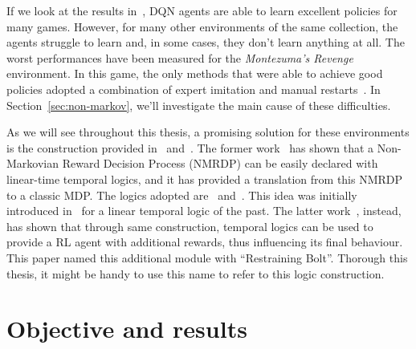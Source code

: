 If we look at the results in~\cite{bib:atari-deepq-nature}, DQN agents are
able to learn excellent policies for many games. However, for many other
environments of the same collection, the agents struggle to learn and, in some
cases, they don't learn anything at all. The worst performances have been
measured for the \emph{Montezuma's Revenge} environment. In this game, the
only methods that were able to achieve good policies adopted a combination of
expert imitation and manual restarts~\cite{bib:mz-openai-demonstrations}.
In Section~\ref{sec:non-markov}, we'll investigate the main cause of these
difficulties.

As we will see throughout this thesis, a promising solution for these
environments is the construction provided in~\cite{bib:degiacomo-logic-nmrdp}
and~\cite{bib:bolt}. The former work~\cite{bib:degiacomo-logic-nmrdp} has
shown that a Non-Markovian Reward Decision Process (NMRDP) can be easily
declared with linear-time temporal logics, and it has provided a translation
from this NMRDP to a classic MDP. The logics adopted are~\ltl{} and~\ldl{}.
This idea was initially introduced in~\cite{bib:nmrdp-logic-first} for a
linear temporal logic of the past. The latter work~\cite{bib:bolt}, instead,
has shown that through same construction, temporal logics can be used to
provide a RL agent with additional rewards, thus influencing its final
behaviour. This paper named this additional module with ``Restraining Bolt''.
Thorough this thesis, it might be handy to use this name to refer to this
logic construction.


\section{Objective and results}

\label{sec:intro-objective}


